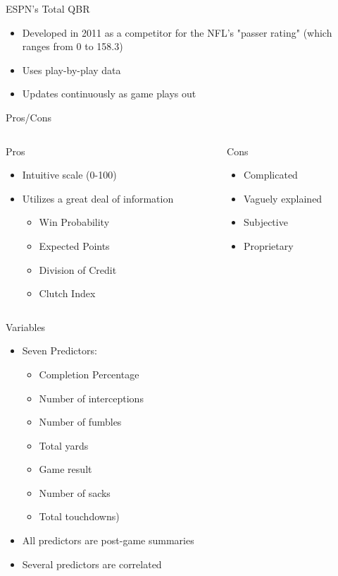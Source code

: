 \documentclass{beamer}
\begin{document}
	\begin{frame}{ESPN's Total QBR}
		\begin{itemize}
			\item Developed in 2011 as a competitor for the NFL's "passer rating" (which ranges from 0 to 158.3)
			\item Uses play-by-play data
			\item Updates continuously as game plays out
		\end{itemize}
		\begin{block}{Pros/Cons}
		\begin{columns}
			\begin{column}[t]{0.4\textwidth}
				Pros
				\begin{itemize}
					\item Intuitive scale (0-100)
					\item Utilizes a great deal of information
					\begin{itemize}
						\item Win Probability
						\item Expected Points
						\item Division of Credit
						\item Clutch Index
					\end{itemize}
				\end{itemize}
			\end{column}
			
			\begin{column}[t]{0.5\textwidth}
				Cons
				\begin{itemize}
					\item Complicated
					\item Vaguely explained
					\item Subjective
					\item Proprietary
				\end{itemize}
			\end{column}
		\end{columns}
		\end{block}
	\end{frame}

	\begin{frame}{Variables}
		\begin{itemize}
			\item Seven Predictors:
			\begin{itemize}
				\item Completion Percentage
				\item Number of interceptions
				\item Number of fumbles
				\item Total yards
				\item Game result
				\item Number of sacks
				\item Total touchdowns)
			\end{itemize}
			\item All predictors are post-game summaries
			\item Several predictors are correlated
		\end{itemize}
	\end{frame}
\end{document}
